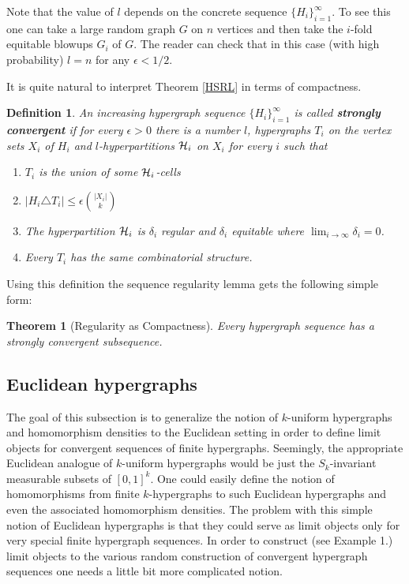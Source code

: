 \documentclass [11pt] {article}
\newtheorem{theorem}{Theorem}
\newtheorem{definition}{Definition}[section]
\def\e{\epsilon}
\def\cH{\mbox{$\cal H$}}
\def\to{\rightarrow}
\begin{document}
Note that the value of $l$ depends on the concrete 
sequence $\{H_i\}_{i=1}^\infty$. To see this one can take a large random 
graph $G$ on $n$ vertices and then take the $i$-fold equitable blowups $G_i$ 
of $G$. The reader can check that in this case (with high probability) $l=n$ 
for any $\epsilon<1/2$.

It is quite natural to interpret Theorem \ref{HSRL} in terms of compactness.

\begin{definition} An increasing hypergraph sequence $\{H_i\}_{i=1}^\infty$ 
is called {\bf strongly convergent} if for every $\epsilon>0$ there 
is a number $l$, hypergraphs $T_i$ on the vertex sets $X_i$ 
of $H_i$ and $l$-hyperpartitions $\cH_i$ on $X_i$ for every $i$ such that
\begin{enumerate}
\item $T_i$ is the union of some $\cH_i$-cells
\item $|H_i\triangle T_i|\leq \e {{|X_i|}\choose{k}}$
\item The hyperpartition $\cH_i$ is $\delta_i$ regular and $\delta_i$ 
equitable where $\lim_{i\to\infty}\delta_i=0$.
\item Every $T_i$ has the same combinatorial structure.
\end{enumerate}
\end{definition}

Using this definition the sequence regularity lemma gets the 
following simple form:

\begin{theorem}[Regularity as Compactness]\label{compa} Every
hypergraph sequence has a strongly convergent subsequence.
\end{theorem}

\subsection{Euclidean hypergraphs}
The goal of this subsection is to generalize the notion of $k$-uniform
hypergraphs and homomorphism densities
to the Euclidean setting in order to define limit objects
for convergent sequences of finite hypergraphs.
Seemingly, the appropriate Euclidean analogue of $k$-uniform hypergraphs
would be just the $S_k$-invariant measurable subsets of $[0,1]^k$. One could
easily define the notion of homomorphisms from finite $k$-hypergraphs
to such Euclidean hypergraphs and even the associated homomorphism densities.
The problem with this simple notion of Euclidean hypergraphs is that they could
serve as limit objects only for very special finite hypergraph sequences.
In order to construct (see Example 1.) limit objects to the
various random construction of convergent hypergraph sequences one needs
a little bit more complicated notion.
\end{document}
